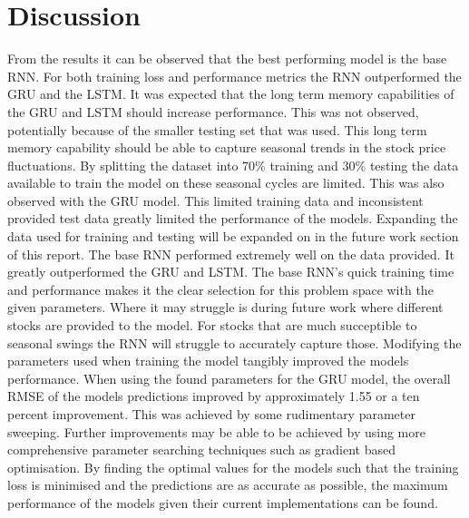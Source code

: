 \documentclass[10pt,twocolumn,letterpaper]{article}
\begin{document}
\section{Discussion}
From the results it can be observed that the best performing model is the base RNN. For both 
training loss and performance metrics the RNN outperformed the GRU and the LSTM. It was 
expected that the long term memory capabilities of the GRU and LSTM should increase performance.
This was not observed, potentially because of the smaller testing set that was used.
This long term memory capability should be able to capture seasonal trends in the stock 
price fluctuations. By splitting the dataset into 70\% training and 30\% testing the 
data available to train the model on these seasonal cycles are limited. This was also observed
with the GRU model. This limited training data and inconsistent provided test data 
greatly limited the performance of the models. Expanding the data used for training and 
testing will be expanded on in the future work section of this report.
The base RNN performed extremely well on the data provided. It greatly outperformed the 
GRU and LSTM. The base RNN's quick training time and performance makes it the clear selection 
for this problem space with the given parameters. Where it may struggle is during future 
work where different stocks are provided to the model. For stocks that are much succeptible 
to seasonal swings the RNN will struggle to accurately capture those. 
Modifying the parameters used when training the model tangibly improved the models performance.
When using the found parameters for the GRU model, the overall RMSE of the models predictions 
improved by approximately 1.55 or a ten percent improvement. This was achieved by some 
rudimentary parameter sweeping. Further improvements may be able to be achieved by using 
more comprehensive parameter searching techniques such as gradient based optimisation.
By finding the optimal values for the models such that the training loss is minimised 
and the predictions are as accurate as possible, the maximum performance of the models  
given their current implementations can be found.
\end{document}
